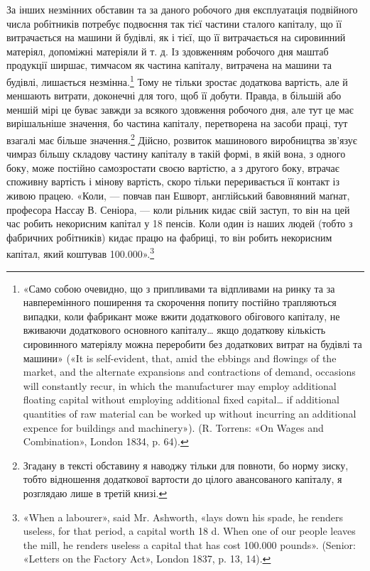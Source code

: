 За інших незмінних обставин та за даного робочого дня експлуатація
подвійного числа робітників потребує подвоєння так
тієї частини сталого капіталу, що її витрачається на машини й
будівлі, як і тієї, що її витрачається на сировинний матеріял,
допоміжні матеріяли й т. д. Із здовженням робочого дня маштаб
продукції ширшає, тимчасом як частина капіталу, витрачена
на машини та будівлі, лишається незмінна.\footnote{
«Само собою очевидно, що з припливами та відпливами на ринку
та за навперемінного поширення та скорочення попиту постійно трапляються випадки, коли фабрикант може вжити додаткового обігового капіталу,
не вживаючи додаткового основного капіталу\dots{} якщо додаткову
кількість сировинного матеріялу можна переробити без додаткових витрат
на будівлі та машини» («It is self-evident, that, amid the ebbings and
flowings of the market, and the alternate expansions and contractions of
demand, occasions will constantly recur, in which the manufacturer may
employ additional floating capital without employing additional fixed
capital\dots{} if additional quantities of raw material can be worked up without
incurring an additional expence for buildings and machinery»).
(R. Torrens: «On Wages and Combination», London 1834, p. 64).
} Тому не тільки
зростає додаткова вартість, але й меншають витрати, доконечні
для того, щоб її добути. Правда, в більшій або меншій мірі це
буває завжди за всякого здовження робочого дня, але тут це
має вирішальніше значення, бо частина капіталу, перетворена
на засоби праці, тут взагалі має більше значення.\footnote{
Згадану в тексті обставину я наводжу тільки для повноти, бо
норму зиску, тобто відношення додаткової вартости до цілого авансованого
капіталу, я розглядаю лише в третій книзі.
} Дійсно,
розвиток машинового виробництва зв’язує чимраз більшу складову
частину капіталу в такій формі, в якій вона, з одного боку, може
постійно самозростати своєю вартістю, а з другого боку, втрачає
споживну вартість і мінову вартість, скоро тільки переривається
її контакт із живою працею. «Коли, — повчав пан Ешворт,
англійський бавовняний маґнат, професора Нассау В. Сеніора, —
коли рільник кидає свій заступ, то він на цей час робить некорисним
капітал у 18 пенсів. Коли один із наших людей (тобто
з фабричних робітників) кидає працю на фабриці, то він робить
некорисним капітал, який коштував \num{100.000}».\footnote{
«When a labourer», said Mr. Ashworth, «lays down his spade, he
renders useless, for that period, a capital worth 18 d. When one of our people
leaves the mill, he renders useless a capital that has cost \num{100.000} pounds».
(Senior: «Letters on the Factory Act», London 1837, p. 13, 14).
}
